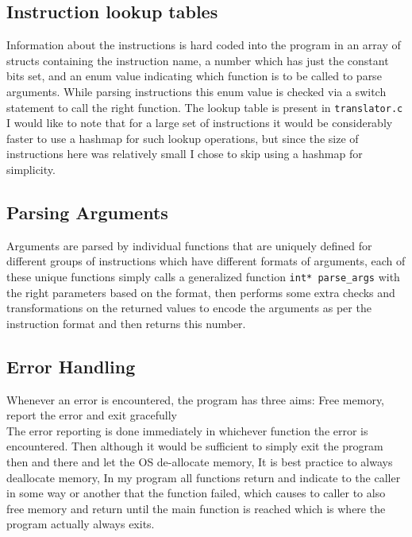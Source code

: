 \documentclass[12pt]{article}
\begin{document}
    \subsection{Instruction lookup tables}
    Information about the instructions is hard coded into the program in an array of structs containing the instruction name, a number which has just the  constant bits set, and an enum value indicating which function is to be called to parse arguments. While parsing instructions this enum value is checked via a switch statement to call the right function. The lookup table is present in \verb#translator.c#
    \\

    I would like to note that for a large set of instructions it would be considerably faster to use a hashmap for such lookup operations, but since the size of instructions here was relatively small I chose to skip using a hashmap for simplicity.

    \subsection{Parsing Arguments}
    Arguments are parsed by individual functions that are uniquely defined for different groups of instructions which have different formats of arguments, each of these unique functions simply calls a generalized function \verb#int* parse_args# with the right parameters based on the format, then performs some extra checks and transformations on the returned values to encode the arguments as per the instruction format and then returns this number.

    \subsection{Error Handling}
    Whenever an error is encountered, the program has three aims: Free memory, report the error and exit gracefully
    \\

    The error reporting is done immediately in whichever function the error is encountered. Then although it would be sufficient to simply exit the program then and there and let the OS de-allocate memory, It is best practice to always deallocate memory, In my program all functions return and indicate to the caller in some way or another that the function failed, which causes to caller to also free memory and return until the main function is reached which is where the program actually always exits.\\
\end{document}
